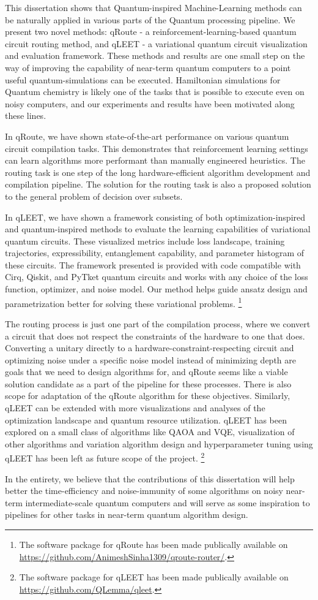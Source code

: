 This dissertation shows that Quantum-inspired Machine-Learning methods can be naturally applied in various parts of the Quantum processing pipeline. We present two novel methods: qRoute - a reinforcement-learning-based quantum circuit routing method, and qLEET - a variational quantum circuit visualization and evaluation framework. These methods and results are one small step on the way of improving the capability of near-term quantum computers to a point useful quantum-simulations can be executed. Hamiltonian simulations for Quantum chemistry is likely one of the tasks that is possible to execute even on noisy computers, and our experiments and results have been motivated along these lines.

In qRoute, we have shown state-of-the-art performance on various quantum circuit compilation tasks. This demonstrates that reinforcement learning settings can learn algorithms more performant than manually engineered heuristics. The routing task is one step of the long hardware-efficient algorithm development and compilation pipeline. The solution for the routing task is also a proposed solution to the general problem of decision over subsets.

In qLEET, we have shown a framework consisting of both optimization-inspired and quantum-inspired methods to evaluate the learning capabilities of variational quantum circuits. These visualized metrics include loss landscape, training trajectories, expressibility, entanglement capability, and parameter histogram of these circuits. The framework presented is provided with code compatible with Cirq, Qiskit, and PyTket quantum circuits and works with any choice of the loss function, optimizer, and noise model. Our method helps guide ansatz design and parametrization better for solving these variational problems.
\footnote{The software package for qRoute has been made publically available on \url{https://github.com/AnimeshSinha1309/qroute-router/}.}

The routing process is just one part of the compilation process, where we convert a circuit that does not respect the constraints of the hardware to one that does. Converting a unitary directly to a hardware-constraint-respecting circuit and optimizing noise under a specific noise model instead of minimizing depth are goals that we need to design algorithms for, and qRoute seems like a viable solution candidate as a part of the pipeline for these processes. There is also scope for adaptation of the qRoute algorithm for these objectives. Similarly, qLEET can be extended with more visualizations and analyses of the optimization landscape and quantum resource utilization. qLEET has been explored on a small class of algorithms like QAOA and VQE, visualization of other algorithms and variation algorithm design and hyperparameter tuning using qLEET has been left as future scope of the project. 
\footnote{The software package for qLEET has been made publically available on \url{https://github.com/QLemma/qleet}.}

In the entirety, we believe that the contributions of this dissertation will help better the time-efficiency and noise-immunity of some algorithms on noisy near-term intermediate-scale quantum computers and will serve as some inspiration to pipelines for other tasks in near-term quantum algorithm design.
